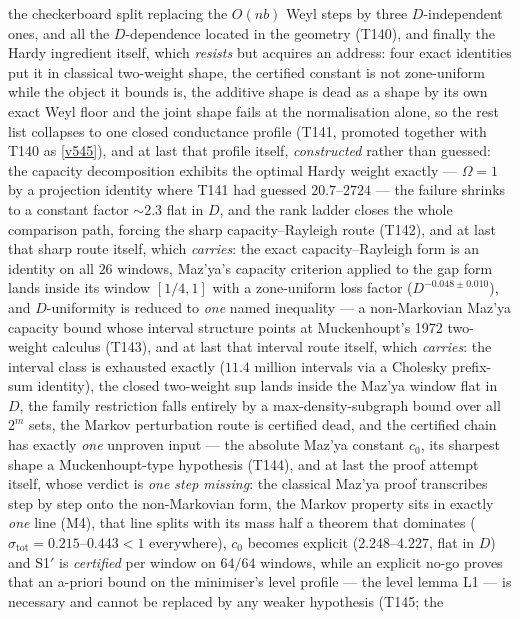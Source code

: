 \documentclass[11pt,a4paper]{article}
\begin{document}
the checkerboard split replacing the $O(nb)$ Weyl steps by three $D$-independent ones, and all the
$D$-dependence located in the geometry (T140), and finally the Hardy ingredient itself, which
\emph{resists} but acquires an address: four exact identities put it in classical two-weight shape,
the certified constant is not zone-uniform while the object it bounds is, the additive shape is dead
as a shape by its own exact Weyl floor and the joint shape fails at the normalisation alone, so the
rest list collapses to one closed conductance profile (T141, promoted together with T140 as
\vref{v545}), and at last that profile itself, \emph{constructed} rather than guessed: the
capacity decomposition exhibits the optimal Hardy weight exactly --- $\Omega=1$ by a projection
identity where T141 had guessed $20.7$--$2724$ --- the failure shrinks to a constant factor
${\sim}2.3$ flat in $D$, and the rank ladder closes the whole comparison path, forcing the sharp
capacity--Rayleigh route (T142), and at last that sharp route itself, which \emph{carries}: the
exact capacity--Rayleigh form is an identity on all $26$ windows, Maz'ya's capacity criterion
applied to the gap form lands inside its window $[1/4,1]$ with a zone-uniform loss factor
($D^{-0.048\pm0.010}$), and $D$-uniformity is reduced to \emph{one} named inequality --- a
non-Markovian Maz'ya capacity bound whose interval structure points at Muckenhoupt's 1972
two-weight calculus (T143), and at last that interval route itself, which \emph{carries}: the
interval class is exhausted exactly ($11.4$ million intervals via a Cholesky prefix-sum
identity), the closed two-weight sup lands inside the Maz'ya window flat in $D$, the family
restriction falls entirely by a max-density-subgraph bound over all $2^m$ sets, the Markov
perturbation route is certified dead, and the certified chain has exactly \emph{one} unproven
input --- the absolute Maz'ya constant $c_0$, its sharpest shape a Muckenhoupt-type hypothesis
(T144), and at last the proof attempt itself, whose verdict is \emph{one step missing}: the
classical Maz'ya proof transcribes step by step onto the non-Markovian form, the Markov property
sits in exactly \emph{one} line (M4), that line splits with its mass half a theorem that
dominates ($\sigma_{\mathrm{tot}}=0.215$--$0.443<1$ everywhere), $c_0$ becomes explicit
($2.248$--$4.227$, flat in $D$) and S1$'$ is \emph{certified} per window on $64/64$ windows,
while an explicit no-go proves that an a-priori bound on the minimiser's level profile --- the
level lemma L1 --- is necessary and cannot be replaced by any weaker hypothesis (T145; the
\end{document}
